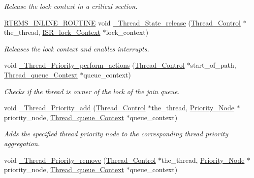 \begin{DoxyCompactItemize}
\begin{DoxyCompactList}\small\item\em Release the lock context in a critical section. \end{DoxyCompactList}\item 
\mbox{\hyperlink{group__RTEMSScoreBaseDefs_gac216239df231d5dbd15e3520b0b9313f}{R\+T\+E\+M\+S\+\_\+\+I\+N\+L\+I\+N\+E\+\_\+\+R\+O\+U\+T\+I\+NE}} void \mbox{\hyperlink{group__RTEMSScoreThread_ga958218590f858b65855c89802b2cc071}{\+\_\+\+Thread\+\_\+\+State\+\_\+release}} (\mbox{\hyperlink{struct__Thread__Control}{Thread\+\_\+\+Control}} $\ast$the\+\_\+thread, \mbox{\hyperlink{structISR__lock__Context}{I\+S\+R\+\_\+lock\+\_\+\+Context}} $\ast$lock\+\_\+context)
\begin{DoxyCompactList}\small\item\em Releases the lock context and enables interrupts. \end{DoxyCompactList}\item 
void \mbox{\hyperlink{group__RTEMSScoreThread_ga611029596b3c9930b05c97cbaef6cb24}{\+\_\+\+Thread\+\_\+\+Priority\+\_\+perform\+\_\+actions}} (\mbox{\hyperlink{struct__Thread__Control}{Thread\+\_\+\+Control}} $\ast$start\+\_\+of\+\_\+path, \mbox{\hyperlink{structThread__queue__Context}{Thread\+\_\+queue\+\_\+\+Context}} $\ast$queue\+\_\+context)
\begin{DoxyCompactList}\small\item\em Checks if the thread is owner of the lock of the join queue. \end{DoxyCompactList}\item 
void \mbox{\hyperlink{group__RTEMSScoreThread_ga58d04f5124606eff3a1da3d42cc79e2f}{\+\_\+\+Thread\+\_\+\+Priority\+\_\+add}} (\mbox{\hyperlink{struct__Thread__Control}{Thread\+\_\+\+Control}} $\ast$the\+\_\+thread, \mbox{\hyperlink{structPriority__Node}{Priority\+\_\+\+Node}} $\ast$priority\+\_\+node, \mbox{\hyperlink{structThread__queue__Context}{Thread\+\_\+queue\+\_\+\+Context}} $\ast$queue\+\_\+context)
\begin{DoxyCompactList}\small\item\em Adds the specified thread priority node to the corresponding thread priority aggregation. \end{DoxyCompactList}\item 
void \mbox{\hyperlink{group__RTEMSScoreThread_ga8c1e1030ce5bea3614f62e8be650bbeb}{\+\_\+\+Thread\+\_\+\+Priority\+\_\+remove}} (\mbox{\hyperlink{struct__Thread__Control}{Thread\+\_\+\+Control}} $\ast$the\+\_\+thread, \mbox{\hyperlink{structPriority__Node}{Priority\+\_\+\+Node}} $\ast$priority\+\_\+node, \mbox{\hyperlink{structThread__queue__Context}{Thread\+\_\+queue\+\_\+\+Context}} $\ast$queue\+\_\+context)

\end{DoxyCompactItemize}
